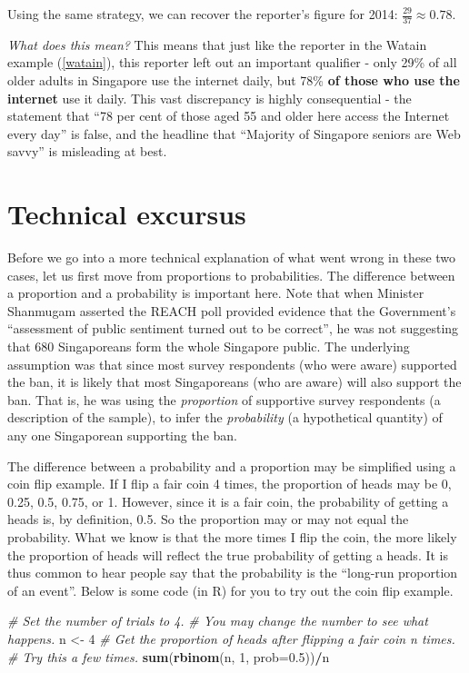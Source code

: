 \documentclass[
  openany]{book}
\newenvironment{Shaded}{\begin{snugshade}}{\end{snugshade}}
\newcommand{\CommentTok}[1]{\textcolor[rgb]{0.56,0.35,0.01}{\textit{#1}}}
\newcommand{\DataTypeTok}[1]{\textcolor[rgb]{0.13,0.29,0.53}{#1}}
\newcommand{\DecValTok}[1]{\textcolor[rgb]{0.00,0.00,0.81}{#1}}
\newcommand{\FloatTok}[1]{\textcolor[rgb]{0.00,0.00,0.81}{#1}}
\newcommand{\KeywordTok}[1]{\textcolor[rgb]{0.13,0.29,0.53}{\textbf{#1}}}
\newcommand{\NormalTok}[1]{#1}
\newcommand{\OperatorTok}[1]{\textcolor[rgb]{0.81,0.36,0.00}{\textbf{#1}}}
\newcommand{\StringTok}[1]{\textcolor[rgb]{0.31,0.60,0.02}{#1}}
\begin{document}
Using the same strategy, we can recover the reporter's figure for 2014: \(\frac{29}{37} \approx 0.78\).

\emph{What does this mean?} This means that just like the reporter in the Watain example (\ref{watain}), this reporter left out an important qualifier - only 29\% of all older adults in Singapore use the internet daily, but 78\% \textbf{of those who use the internet} use it daily. This vast discrepancy is highly consequential - the statement that ``78 per cent of those aged 55 and older here access the Internet every day'' is false, and the headline that ``Majority of Singapore seniors are Web savvy'' is misleading at best.

\hypertarget{ooptech}{%
\section{Technical excursus}\label{ooptech}}

Before we go into a more technical explanation of what went wrong in these two cases, let us first move from proportions to probabilities. The difference between a proportion and a probability is important here. Note that when Minister Shanmugam asserted the REACH poll provided evidence that the Government's ``assessment of public sentiment turned out to be correct'', he was not suggesting that 680 Singaporeans form the whole Singapore public. The underlying assumption was that since most survey respondents (who were aware) supported the ban, it is likely that most Singaporeans (who are aware) will also support the ban. That is, he was using the \emph{proportion} of supportive survey respondents (a description of the sample), to infer the \emph{probability} (a hypothetical quantity) of any one Singaporean supporting the ban.

The difference between a probability and a proportion may be simplified using a coin flip example. If I flip a fair coin 4 times, the proportion of heads may be 0, 0.25, 0.5, 0.75, or 1. However, since it is a fair coin, the probability of getting a heads is, by definition, 0.5. So the proportion may or may not equal the probability. What we know is that the more times I flip the coin, the more likely the proportion of heads will reflect the true probability of getting a heads. It is thus common to hear people say that the probability is the ``long-run proportion of an event''. Below is some code (in R) for you to try out the coin flip example.

\begin{Shaded}
\begin{Highlighting}[]
\CommentTok{# Set the number of trials to 4. }
\CommentTok{# You may change the number to see what happens.}
\NormalTok{n <-}\StringTok{ }\DecValTok{4} 
\CommentTok{# Get the proportion of heads after flipping a fair coin n times. }
\CommentTok{# Try this a few times.}
\KeywordTok{sum}\NormalTok{(}\KeywordTok{rbinom}\NormalTok{(n, }\DecValTok{1}\NormalTok{, }\DataTypeTok{prob=}\FloatTok{0.5}\NormalTok{))}\OperatorTok{/}\NormalTok{n }
\end{Highlighting}
\end{Shaded}
\end{document}
